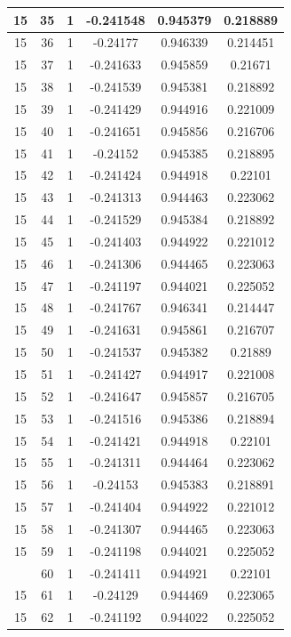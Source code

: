 \documentclass[12pt,a4paper]{article}
\numberwithin{equation}{section}
\numberwithin{figure}{section}
\numberwithin{table}{section}
\begin{document}
\begin{longtable}{|c|c|c|c|c|c|}
15 & 35 & 1 & -0.241548 & 0.945379 & 0.218889 \\ \hline
15 & 36 & 1 & -0.24177 & 0.946339 & 0.214451 \\ \hline
15 & 37 & 1 & -0.241633 & 0.945859 & 0.21671 \\ \hline
15 & 38 & 1 & -0.241539 & 0.945381 & 0.218892 \\ \hline
15 & 39 & 1 & -0.241429 & 0.944916 & 0.221009 \\ \hline
15 & 40 & 1 & -0.241651 & 0.945856 & 0.216706 \\ \hline
15 & 41 & 1 & -0.24152 & 0.945385 & 0.218895 \\ \hline
15 & 42 & 1 & -0.241424 & 0.944918 & 0.22101 \\ \hline
15 & 43 & 1 & -0.241313 & 0.944463 & 0.223062 \\ \hline
15 & 44 & 1 & -0.241529 & 0.945384 & 0.218892 \\ \hline
15 & 45 & 1 & -0.241403 & 0.944922 & 0.221012 \\ \hline
15 & 46 & 1 & -0.241306 & 0.944465 & 0.223063 \\ \hline
15 & 47 & 1 & -0.241197 & 0.944021 & 0.225052 \\ \hline
15 & 48 & 1 & -0.241767 & 0.946341 & 0.214447 \\ \hline
15 & 49 & 1 & -0.241631 & 0.945861 & 0.216707 \\ \hline
15 & 50 & 1 & -0.241537 & 0.945382 & 0.21889 \\ \hline
15 & 51 & 1 & -0.241427 & 0.944917 & 0.221008 \\ \hline
15 & 52 & 1 & -0.241647 & 0.945857 & 0.216705 \\ \hline
15 & 53 & 1 & -0.241516 & 0.945386 & 0.218894 \\ \hline
15 & 54 & 1 & -0.241421 & 0.944918 & 0.22101 \\ \hline
15 & 55 & 1 & -0.241311 & 0.944464 & 0.223062 \\ \hline
15 & 56 & 1 & -0.24153 & 0.945383 & 0.218891 \\ \hline
15 & 57 & 1 & -0.241404 & 0.944922 & 0.221012 \\ \hline
15 & 58 & 1 & -0.241307 & 0.944465 & 0.223063 \\ \hline
15 & 59 & 1 & -0.241198 & 0.944021 & 0.225052 \\ \hline
\pagebreak
15 & 60 & 1 & -0.241411 & 0.944921 & 0.22101 \\ \hline
15 & 61 & 1 & -0.24129 & 0.944469 & 0.223065 \\ \hline
15 & 62 & 1 & -0.241192 & 0.944022 & 0.225052 \\ \hline

\end{longtable}
\end{document}
